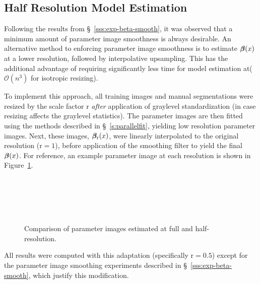 \subsection{Half Resolution Model Estimation}\label{ss:halfres}
Following the results from \S~\ref{sss:exp-beta-smooth},
it was observed that a minimum amount of parameter image smoothness is always desirable.
An alternative method to enforcing parameter image smoothness
is to estimate $\bm{\beta}(x)$ at a lower resolution, followed by interpolative upsampling.
This has the additional advantage of requiring significantly less time for model estimation
at($\mathcal{O}(n^3)$ for isotropic resizing).
\par
To implement this approach, all training images and manual segmentations
were resized by the scale factor $\mathrm{r}$
\textit{after} application of graylevel standardization
(in case resizing affects the graylevel statistics).
The parameter images are then fitted using the methods described in \S~\ref{s:parallelfit},
yielding low resolution parameter images.
Next, these images, $\bm{\beta}_{\mathrm{r}}(x)$,
were linearly interpolated to the original resolution ($\mathrm{r} = 1$),
before application of the smoothing filter to yield the final $\bm{\beta}(x)$.
For reference, an example parameter image at each resolution
is shown in Figure~\ref{fig:beta-r}.
\par
\begin{figure}
  \centering
  \\[0.5em]
  \\[0.5em]
  \\[0.5em]
  \\[0.5em]
  \caption{Comparison of parameter images estimated at full and half-resolution.}%
  \label{fig:beta-r}
\end{figure}
All results were computed with this adaptation (specifically $\mathrm{r} = 0.5$)
except for the parameter image smoothing experiments described in \S~\ref{sss:exp-beta-smooth},
which justify this modification.
